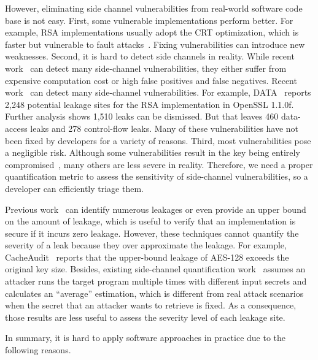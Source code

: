 However, eliminating side channel vulnerabilities from real-world software code base is not easy. First, some vulnerable implementations perform better. For example, RSA implementations usually adopt the CRT optimization,
which is faster but vulnerable to fault attacks~\cite{aumuller2002fault}. Fixing vulnerabilities can introduce new 
weaknesses. Second, it is hard to detect side channels in reality. While recent work~\cite{203878,217537,Wichelmann:2018:MFF:3274694.3274741,Brotzman19Casym,236338,182946} can detect many side-channel vulnerabilities, they either suffer from expensive computation cost or high false positives and false negatives. Recent work~\cite{203878,217537,Wichelmann:2018:MFF:3274694.3274741,Brotzman19Casym,236338,182946} can detect many side-channel vulnerabilities. For example, DATA~\cite{217537} reports 2,248 potential leakage sites for the RSA implementation in OpenSSL 1.1.0f\@. Further analysis shows 1,510 leaks can be dismissed. But that leaves 460 data-access leaks and 278 control-flow leaks. Many of these vulnerabilities have not been fixed by developers for a variety of reasons. Third, most vulnerabilities pose a negligible risk. 
Although some vulnerabilities result in the key being 
entirely compromised~\cite{184415, aumuller2002fault}, 
many others are less severe in reality. Therefore, we need a proper quantification metric to assess the sensitivity of side-channel vulnerabilities, so a developer can efficiently triage them.

Previous work~\cite{182946,5207642} can identify numerous leakages or even provide an upper bound on the amount of leakage, which is useful to verify that an implementation is secure if it incurs zero leakage.
However, these techniques cannot quantify the severity of a leak because they over approximate the leakage. For example, CacheAudit~\cite{182946} 
reports that the upper-bound leakage of AES-128 exceeds the original key size. Besides, existing side-channel quantification work~\cite{182946,5207642} assumes an attacker runs the target program multiple times with different
input secrets and calculates an ``average'' estimation, which is different from real attack scenarios when the secret that an attacker wants to retrieve is fixed. As a consequence, those results are less useful to assess the severity level of each leakage site.


In summary, it is hard to apply software approaches in practice due to the following reasons.

